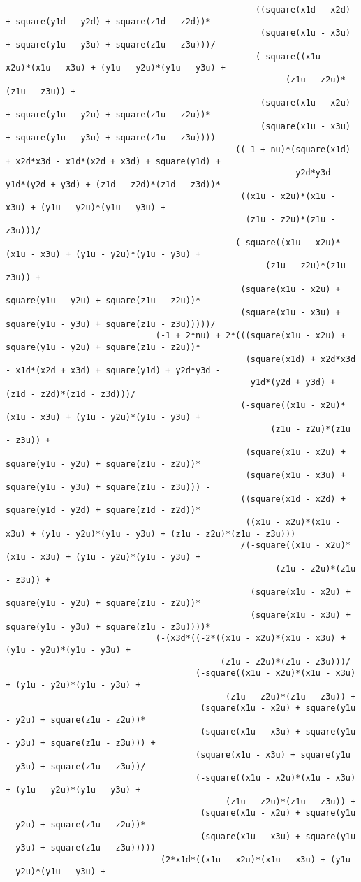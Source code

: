 \begin{lstlisting}
												  ((square(x1d - x2d) + square(y1d - y2d) + square(z1d - z2d))*
												   (square(x1u - x3u) + square(y1u - y3u) + square(z1u - z3u)))/
												  (-square((x1u - x2u)*(x1u - x3u) + (y1u - y2u)*(y1u - y3u) + 
														(z1u - z2u)*(z1u - z3u)) + 
												   (square(x1u - x2u) + square(y1u - y2u) + square(z1u - z2u))*
												   (square(x1u - x3u) + square(y1u - y3u) + square(z1u - z3u)))) - 
											  ((-1 + nu)*(square(x1d) + x2d*x3d - x1d*(x2d + x3d) + square(y1d) + 
														  y2d*y3d - y1d*(y2d + y3d) + (z1d - z2d)*(z1d - z3d))*
											   ((x1u - x2u)*(x1u - x3u) + (y1u - y2u)*(y1u - y3u) + 
												(z1u - z2u)*(z1u - z3u)))/
											  (-square((x1u - x2u)*(x1u - x3u) + (y1u - y2u)*(y1u - y3u) + 
													(z1u - z2u)*(z1u - z3u)) + 
											   (square(x1u - x2u) + square(y1u - y2u) + square(z1u - z2u))*
											   (square(x1u - x3u) + square(y1u - y3u) + square(z1u - z3u)))))/
							  (-1 + 2*nu) + 2*(((square(x1u - x2u) + square(y1u - y2u) + square(z1u - z2u))*
												(square(x1d) + x2d*x3d - x1d*(x2d + x3d) + square(y1d) + y2d*y3d - 
												 y1d*(y2d + y3d) + (z1d - z2d)*(z1d - z3d)))/
											   (-square((x1u - x2u)*(x1u - x3u) + (y1u - y2u)*(y1u - y3u) + 
													 (z1u - z2u)*(z1u - z3u)) + 
												(square(x1u - x2u) + square(y1u - y2u) + square(z1u - z2u))*
												(square(x1u - x3u) + square(y1u - y3u) + square(z1u - z3u))) - 
											   ((square(x1d - x2d) + square(y1d - y2d) + square(z1d - z2d))*
												((x1u - x2u)*(x1u - x3u) + (y1u - y2u)*(y1u - y3u) + (z1u - z2u)*(z1u - z3u)))
											   /(-square((x1u - x2u)*(x1u - x3u) + (y1u - y2u)*(y1u - y3u) + 
													  (z1u - z2u)*(z1u - z3u)) + 
												 (square(x1u - x2u) + square(y1u - y2u) + square(z1u - z2u))*
												 (square(x1u - x3u) + square(y1u - y3u) + square(z1u - z3u))))*
							  (-(x3d*((-2*((x1u - x2u)*(x1u - x3u) + (y1u - y2u)*(y1u - y3u) + 
										   (z1u - z2u)*(z1u - z3u)))/
									  (-square((x1u - x2u)*(x1u - x3u) + (y1u - y2u)*(y1u - y3u) + 
											(z1u - z2u)*(z1u - z3u)) + 
									   (square(x1u - x2u) + square(y1u - y2u) + square(z1u - z2u))*
									   (square(x1u - x3u) + square(y1u - y3u) + square(z1u - z3u))) + 
									  (square(x1u - x3u) + square(y1u - y3u) + square(z1u - z3u))/
									  (-square((x1u - x2u)*(x1u - x3u) + (y1u - y2u)*(y1u - y3u) + 
											(z1u - z2u)*(z1u - z3u)) + 
									   (square(x1u - x2u) + square(y1u - y2u) + square(z1u - z2u))*
									   (square(x1u - x3u) + square(y1u - y3u) + square(z1u - z3u))))) - 
							   (2*x1d*((x1u - x2u)*(x1u - x3u) + (y1u - y2u)*(y1u - y3u) + 

\end{lstlisting}
